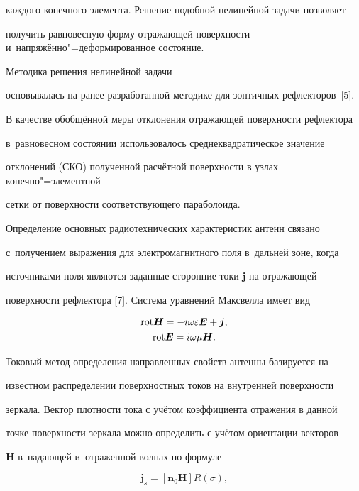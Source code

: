 каждого конечного элемента. Решение подобной нелинейной задачи позволяет 

получить равновесную форму отражающей поверхности и~напряжённо"=деформированное состояние. 

Методика решения нелинейной задачи 

основывалась на ранее разработанной методике для зонтичных рефлекторов~[5]. 



В качестве обобщённой меры отклонения отражающей поверхности рефлектора 

в~равновесном состоянии использовалось среднеквадратическое значение 

отклонений (СКО) полученной расчётной поверхности в узлах конечно"=элементной 

сетки от поверхности соответствующего параболоида. 




Определение основных радиотехнических характеристик антенн связано 

с~получением выражения для электромагнитного поля в~дальней зоне, когда 

источниками поля являются заданные сторонние токи $\boldsymbol j$ на отражающей 

поверхности рефлектора [7]. Система уравнений Максвелла имеет вид

\begin{gather*}

{\rm rot }{\boldsymbol H}=-i \omega \varepsilon {\boldsymbol E}+\boldsymbol j 

, \\ 

{\rm rot }{\boldsymbol E}=i \omega \mu {\boldsymbol H}.

 \end{gather*}



Токовый метод определения направленных свойств антенны базируется на 

известном распределении поверхностных токов на внутренней поверхности 

зеркала. Вектор плотности тока с учётом коэффициента отражения в данной 

точке поверхности зеркала можно определить с учётом ориентации векторов 

$\boldsymbol H$ в~падающей и~отраженной волнах по формуле

\begin{equation*}

\label{belkov:eq8}

{\boldsymbol  j}_s=[\boldsymbol n_{0} \boldsymbol H ]R(\sigma),

\end{equation*}

